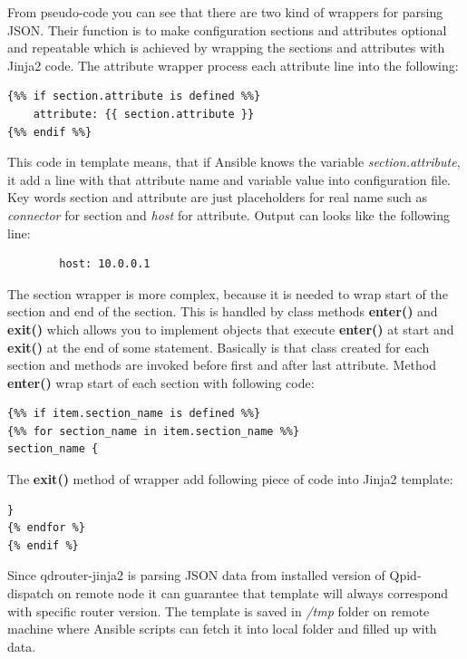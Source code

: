 From pseudo-code you can see that there are two kind of wrappers for parsing JSON. Their function is to make configuration sections and attributes optional and repeatable which is achieved by wrapping the sections and attributes with Jinja2 code. The attribute wrapper process each attribute line into the following:

\begin{verbatim}
{%% if section.attribute is defined %%}
    attribute: {{ section.attribute }}
{%% endif %%}
\end{verbatim}

This code in template means, that if Ansible knows the variable \emph{section.attribute}, it add a line with that attribute name and variable value into configuration file. Key words section and attribute are just placeholders for real name such as \emph{connector} for section and \emph{host} for attribute. Output can looks like the following line:

\begin{verbatim}
		host: 10.0.0.1
\end{verbatim}

The section wrapper is more complex, because it is needed to wrap start of the section and end of the section. This is handled by class methods \textbf{\textunderscore enter\textunderscore ()} and \textbf{\textunderscore exit\textunderscore ()} which allows you to implement objects that execute \textbf{\textunderscore enter\textunderscore ()} at start and \textbf{\textunderscore exit\textunderscore ()} at the end of some statement. Basically is that class created for each section and methods are invoked before first and after last attribute. Method \textbf{\textunderscore enter\textunderscore ()} wrap start of each section with following code:

\begin{verbatim}
{%% if item.section_name is defined %%}
{%% for section_name in item.section_name %%}
section_name {
\end{verbatim}

The \textbf{\textunderscore exit\textunderscore ()} method of wrapper add following piece of code into Jinja2 template:
\begin{verbatim}
}
{% endfor %}
{% endif %}
\end{verbatim}

Since qdrouter-jinja2 is parsing JSON data from installed version of Qpid-dispatch on remote node it can guarantee that template will always correspond with specific router version. The template is saved in \emph{/tmp} folder on remote machine where Ansible scripts can fetch it into local folder and filled up with data.

